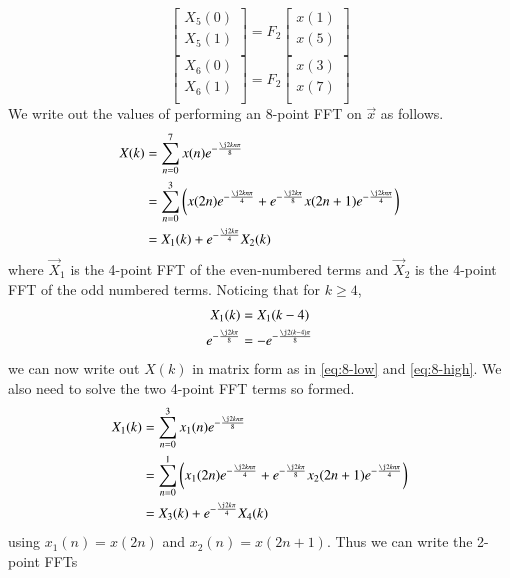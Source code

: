 \documentclass[journal,12pt,twocolumn]{IEEEtran}
\renewcommand\thesection{\arabic{section}}
\begin{document}
\begin{enumerate}[label=\arabic*.,ref=\thesection.\theenumi]
	\begin{equation}
		\begin{bmatrix}
			X_{5}(0) \\ 
			X_{5}(1)\\ 
		\end{bmatrix}
		= F_{2}
		\begin{bmatrix}
			x(1) \\ 
			x(5) \\ 
		\end{bmatrix}
	\end{equation}
	\begin{equation}
		\begin{bmatrix}
			X_{6}(0) \\ 
			X_{6}(1)\\ 
		\end{bmatrix}
		= F_{2}
		\begin{bmatrix}
			x(3) \\ 
			x(7) \\ 
		\end{bmatrix}
	\end{equation}
	\solution We write out the values of performing an 8-point FFT on $\vec{x}$ as follows.
	\begin{align}
		X(k) &= \sum_{n = 0}^{7}x(n)e^{-\frac{\j2kn\pi}{8}} \\
		&= \sum_{n = 0}^{3}\brak{x(2n)e^{-\frac{\j2kn\pi}{4}} + e^{-\frac{\j2k\pi}{8}}x(2n + 1)e^{-\frac{\j2kn\pi}{4}}} \\
		&= X_1(k) + e^{-\frac{\j2k\pi}{4}}X_2(k) 
	\end{align}
	where $\vec{X}_1$ is the 4-point FFT of the even-numbered terms and $\vec{X}_2$ is the 4-point FFT of the odd numbered terms. Noticing that for $k \geq 4$,
	\begin{align}
		X_1(k) &= X_1(k - 4) \\
		e^{-\frac{\j2k\pi}{8}} &= -e^{-\frac{\j2(k - 4)\pi}{8}}
	\end{align}
	we can now write out $X(k)$ in matrix form as in \eqref{eq:8-low} and \eqref{eq:8-high}. We also need to solve the two 4-point FFT terms so formed.
	\begin{align}
		X_1(k) &= \sum_{n = 0}^{3}x_1(n)e^{-\frac{\j2kn\pi}{8}} \\
		&= \sum_{n = 0}^{1}\brak{x_1(2n)e^{-\frac{\j2kn\pi}{4}} + e^{-\frac{\j2k\pi}{8}}x_2(2n + 1)e^{-\frac{\j2kn\pi}{4}}} \\
		&= X_3(k) + e^{-\frac{\j2k\pi}{4}}X_4(k) 
	\end{align}
	using $x_1(n) = x(2n)$ and $x_2(n) = x(2n + 1)$. Thus we can write the 2-point FFTs

\end{enumerate}
\end{document}
